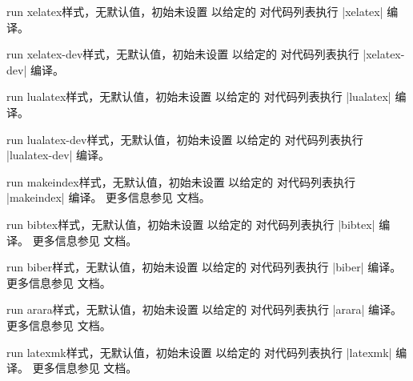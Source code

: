 \begin{docTcbKey}[][doc new=2014-11-14]{run xelatex}{}{样式，无默认值，初始未设置}
以给定的  对代码列表执行 |xelatex| 编译。
\end{docTcbKey}

\begin{docTcbKey}[][doc new=2025-05-20]{run xelatex-dev}{}{样式，无默认值，初始未设置}
以给定的  对代码列表执行 |xelatex-dev| 编译。
\end{docTcbKey}

\begin{docTcbKey}[][doc new=2014-11-14]{run lualatex}{}{样式，无默认值，初始未设置}
以给定的  对代码列表执行 |lualatex| 编译。
\end{docTcbKey}

\begin{docTcbKey}[][doc new=2025-05-20]{run lualatex-dev}{}{样式，无默认值，初始未设置}
以给定的  对代码列表执行 |lualatex-dev| 编译。
\end{docTcbKey}

\begin{docTcbKey}[][doc new=2014-11-14]{run makeindex}{}{样式，无默认值，初始未设置}
以给定的  对代码列表执行 |makeindex| 编译。
更多信息参见  文档。
\end{docTcbKey}

\begin{docTcbKey}[][doc new=2014-11-14]{run bibtex}{}{样式，无默认值，初始未设置}
以给定的  对代码列表执行 |bibtex| 编译。
更多信息参见  文档。
\end{docTcbKey}

\begin{docTcbKey}[][doc new=2014-11-14]{run biber}{}{样式，无默认值，初始未设置}
以给定的  对代码列表执行 |biber| 编译。
更多信息参见  文档。
\end{docTcbKey}

\begin{docTcbKey}[][doc new=2014-11-14]{run arara}{}{样式，无默认值，初始未设置}
以给定的  对代码列表执行 |arara| 编译。
更多信息参见  文档。
\end{docTcbKey}

\begin{docTcbKey}[][doc new=2025-05-20]{run latexmk}{}{样式，无默认值，初始未设置}
以给定的  对代码列表执行 |latexmk| 编译。
更多信息参见  文档。
\end{docTcbKey}

